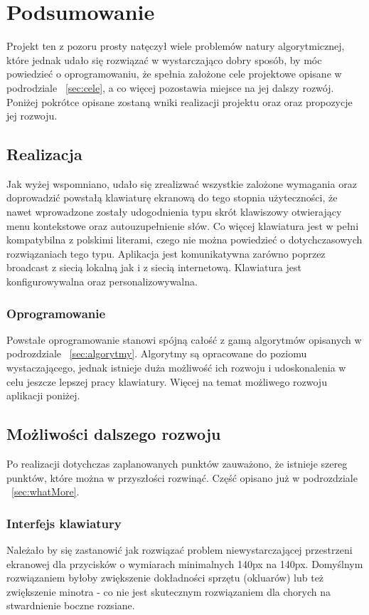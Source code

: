 \documentclass[twoside,a4paper]{book}
\begin{document}
\chapter{Podsumowanie}
Projekt ten z pozoru prosty natęczył wiele problemów natury algorytmicznej, które jednak udało się rozwiązać w wystarczająco dobry sposób, by móc powiedzieć o oprogramowaniu, że spełnia założone cele projektowe opisane w podrodziale ~\ref{sec:cele}, a co więcej pozostawia miejsce na jej dalszy rozwój. Poniżej pokrótce opisane zostaną wniki realizacji projektu oraz oraz propozycje jej rozwoju.
\section{Realizacja}
Jak wyżej wspomniano, udało się zrealizwać wszystkie zalożone wymagania oraz doprowadzić powstałą klawiaturę ekranową do tego stopnia użyteczności, że nawet wprowadzone zostały udogodnienia typu skrót klawiszowy otwierający menu kontekstowe oraz autouzupełnienie słów. Co więcej klawiatura jest w pełni kompatybilna z polskimi literami, czego nie można powiedzieć o dotychczasowych rozwiązaniach tego typu. Aplikacja jest komunikatywna zarówno poprzez broadcast z siecią lokalną jak i z siecią internetową.  Klawiatura jest konfigurowywalna oraz personalizowywalna.  
\subsection{Oprogramowanie}
Powstałe oprogramowanie stanowi spójną całość z gamą algorytmów opisanych w podrozdziale ~\ref{sec:algorytmy}. Algorytmy są opracowane do poziomu wystaczającego, jednak istnieje duża możliwość ich rozwoju i udoskonalenia w celu jeszcze lepszej pracy klawiatury. Więcej na temat możliwego rozwoju aplikacji poniżej.
\section{Możliwości dalszego rozwoju}
Po realizacji dotychczas zaplanowanych punktów zauważono, że istnieje szereg punktów, które można w przyszłości rozwinąć. Część opisano już w podrozdziale ~\ref{sec:whatMore}. 
\subsection{Interfejs klawiatury}
Należało by się zastanowić jak rozwiązać problem niewystarczającej przestrzeni ekranowej dla przycisków o wymiarach minimalnych 140px na 140px. Domyślnym rozwiązaniem byłoby zwiększenie dokładności sprzętu (okluarów) lub też zwiększenie minotra - co nie jest skutecznym rozwiązaniem dla chorych na stwardnienie boczne rozsiane. 
\end{document}

